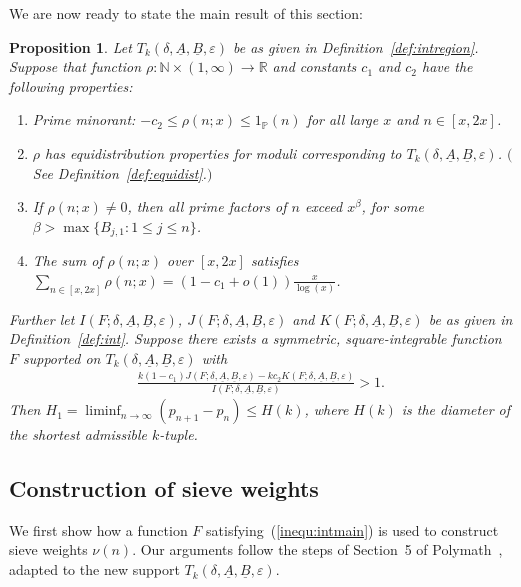 \documentclass{amsart}
\newtheorem{prop}{Proposition}
\numberwithin{equation}{section}
\begin{document}
\medskip We are now ready to state the main result of this section: 
\begin{prop}\label{prop:GPYsieve}
Let  $T_k(\delta,\underline{A},\underline{B},\varepsilon)$ be as given in Definition~\ref{def:intregion}. Suppose that function $\rho: \mathbb{N} \times (1,\infty) \rightarrow \mathbb{R}$ and constants $c_1$ and $c_2$ have the following properties:
\begin{enumerate}[{\rm(1)}]
\item  Prime minorant: $-c_2 \leq \rho(n;x) \leq 1_{\mathbb{P}}(n)$ for all large $x$ and $n \in [x,2x]$.  
\item  $\rho$ has  equidistribution properties for  moduli corresponding to $T_k(\delta,\underline{A},\underline{B},\varepsilon)$. $($See Definition~\ref{def:equidist}.$)$
\item If $\rho(n;x) \neq 0$, then all prime factors of $n$ exceed $x^\beta$, for some $\beta > \max\{ B_{j,1}: 1\leq j \leq n \}$.  
\item The sum of $\rho(n;x)$ over $[x,2x]$ satisfies
$\sum_{n \in [x,2x]} \rho(n;x) = (1-c_1 +o(1)) \frac{x}{\log(x)}$.
\end{enumerate}
Further let $I(F;\delta,\underline{A},\underline{B},\varepsilon)$,  $J(F;\delta,\underline{A},\underline{B},\varepsilon)$ and $K(F;\delta,\underline{A},\underline{B},\varepsilon)$ be as given in Definition~\ref{def:int}. Suppose there exists a symmetric, square-integrable function $F$ supported on $T_k(\delta,\underline{A},\underline{B},\varepsilon)$ with 
\begin{align}\label{inequ:intmain}
\frac{k(1-c_1)  J(F;\delta,\underline{A},\underline{B},\varepsilon)-k c_2   K(F;\delta,\underline{A},\underline{B},\varepsilon)}{I(F;\delta,\underline{A},\underline{B},\varepsilon)} > 1.
\end{align}
Then $H_1 = \liminf_{n \rightarrow \infty} (p_{n+1}-p_n) \leq H(k)$, where $H(k)$ is the diameter of the shortest admissible $k$-tuple.
\end{prop}

\subsection{Construction of sieve weights} 

We first show how a function $F$ satisfying~(\ref{inequ:intmain}) is used to construct sieve weights $\nu(n)$. Our arguments   follow the steps of Section~5 of Polymath~\cite{Polymath:2014:VSS}, adapted to the new support $T_k(\delta,\underline{A},\underline{B},\varepsilon)$. 
\end{document}
